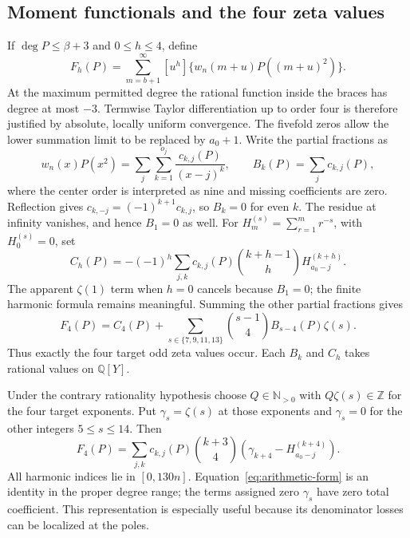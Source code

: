 \documentclass[11pt]{article}
\theoremstyle{definition}\newtheorem{definition}[theorem]{Definition}
\theoremstyle{remark}\newtheorem{remark}[theorem]{Remark}
\newcommand{\Q}{\mathbb Q}\newcommand{\R}{\mathbb R}\newcommand{\C}{\mathbb C}\newcommand{\Z}{\mathbb Z}\newcommand{\N}{\mathbb N}
\begin{document}
\subsection{Moment functionals and the four zeta values}
If $\deg P\le\beta+3$ and $0\le h\le4$, define
\begin{equation}\label{eq:F}
 F_h(P)=\sum_{m=b+1}^{\infty}[u^h]\{w_n(m+u)P((m+u)^2)\}.
\end{equation}
At the maximum permitted degree the rational function inside the braces
has degree at most $-3$.  Termwise Taylor differentiation up to order four
is therefore justified by absolute, locally uniform convergence.  The
fivefold zeros allow the lower summation limit to be replaced by $a_0+1$.
Write the partial fractions as
\begin{equation}\label{eq:pf}
 w_n(x)P(x^2)=\sum_j\sum_{k=1}^{o_j}\frac{c_{k,j}(P)}{(x-j)^k},
 \qquad B_k(P)=\sum_jc_{k,j}(P),
\end{equation}
where the center order is interpreted as nine and missing coefficients
are zero.  Reflection gives
$c_{k,-j}=(-1)^{k+1}c_{k,j}$, so $B_k=0$ for even $k$.
The residue at infinity vanishes, and hence $B_1=0$ as well.
For $H_m^{(s)}=\sum_{r=1}^m r^{-s}$, with $H_0^{(s)}=0$, set
\begin{equation}\label{eq:C}
 C_h(P)=-(-1)^h\sum_{j,k}c_{k,j}(P)
       \binom{k+h-1}{h}H_{a_0-j}^{(k+h)}.
\end{equation}
The apparent $\zeta(1)$ term when $h=0$ cancels because $B_1=0$;
the finite harmonic formula remains meaningful.  Summing the other
partial fractions gives
\begin{equation}\label{eq:zeta-form}
 F_4(P)=C_4(P)+\sum_{s\in\{7,9,11,13\}}
                  \binom{s-1}{4}B_{s-4}(P)\zeta(s).
\end{equation}
Thus exactly the four target odd zeta values occur.  Each $B_k$ and $C_h$
takes rational values on $\Q[Y]$.

Under the contrary rationality hypothesis choose $Q\in\N_{>0}$ with
$Q\zeta(s)\in\Z$ for the four target exponents.  Put $\gamma_s=\zeta(s)$
at those exponents and $\gamma_s=0$ for the other integers $5\le s\le14$.
Then
\begin{equation}\label{eq:arithmetic-form}
 F_4(P)=\sum_{j,k}c_{k,j}(P)\binom{k+3}{4}
              \left(\gamma_{k+4}-H_{a_0-j}^{(k+4)}\right).
\end{equation}
All harmonic indices lie in $[0,130n]$.  Equation~\eqref{eq:arithmetic-form}
is an identity in the proper degree range; the terms assigned zero
$\gamma_s$ have zero total coefficient.  This representation is especially
useful because its denominator losses can be localized at the poles.
\end{document}
